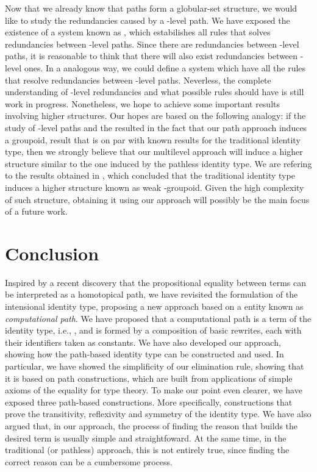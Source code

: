 \documentclass{entcs} \usepackage{entcsmacro}
\begin{document}
Now that we already know that paths form a globular-set structure, we would like to study the redundancies caused by a -level path. We have exposed the existence of a system known as , which estabilishes all rules that solves redundancies between -level paths. Since there are redundancies between -level paths, it is reasonable to think that there will also exist redundancies between -level ones. In a analogous way, we could define a  system which have all the rules that resolve redundancies between -level paths. Neverless, the complete understanding of -level redundancies and what possible rules  should have is still work in progress. Nonetheless, we hope to achieve some important results involving higher structures. Our hopes are based on the following analogy: if the study of -level paths and the   resulted in the fact that our path approach induces a groupoid, result that is on par with known results for the traditional identity type, then we strongly believe that our multilevel approach will induce a higher structure similar to the one induced by the pathless identity type. We are refering to the results obtained in \cite{lumsdaine1,Benno}, which concluded that the traditional identity type induces a higher structure known as weak -groupoid. Given the high complexity of such structure, obtaining it using our approach will possibly be the main focus of a future work.

\section{Conclusion}

Inspired by a recent discovery that the propositional equality between terms can be interpreted as a homotopical path, we have revisited the formulation of the intensional identity type, proposing a new approach based on a entity known as {\em computational path}. We have proposed that a computational path  is a term  of the identity type, i.e., , and is formed by a composition of basic rewrites, each with their identifiers taken as constants. We have also developed our approach, showing how the path-based identity type can be constructed and used. In particular, we have showed the simplificity of our elimination rule, showing that it is based on path constructions, which are built from applications of simple axioms of the equality for type theory. To make our point even clearer, we have exposed three path-based constructions. More specifically, constructions that prove the transitivity, reflexivity and symmetry of the identity type. We have also argued that, in our approach, the process of finding the reason that builds the desired term is usually simple and straightfoward. At the same time, in the traditional (or pathless) approach, this is not entirely true, since finding the correct reason can be a cumbersome process.
\end{document}
